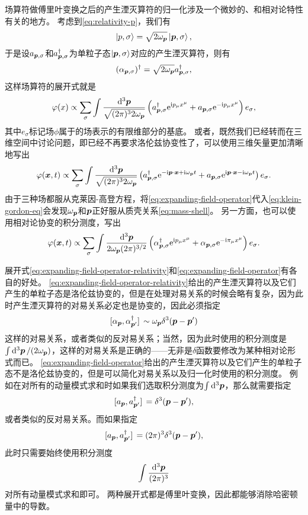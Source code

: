 \documentclass[hyperref, UTF8, a4paper]{ctexart}
\newcommand*{\ii}{\mathrm{i}}
\newcommand*{\ee}{\mathrm{e}}
\begin{document}
场算符做傅里叶变换之后的产生湮灭算符的归一化涉及一个微妙的、和相对论特性有关的地方。
考虑到\eqref{eq:relativity-p}，我们有
\[
    \ket{p, \sigma} = \sqrt{2 \omega_{\vb*{p}}} \ket{\vb*{p}, \sigma},
\]
于是设${a}_{\vb*{p}, \sigma}$和${a}^\dagger_{\vb*{p}, \sigma}$为单粒子态$\ket{\vb*{p}, \sigma}$对应的产生湮灭算符，则有
\[
    ({\alpha}_{\vb*{p}, \sigma})^\dagger = \sqrt{2\omega_{\vb*{p}}} {a}_{\vb*{p}, \sigma}^\dagger,
\]
这样场算符的展开式就是
\[
    {\varphi}(x) \propto \sum_\sigma \int \frac{\dd[3]{\vb*{p}}}{\sqrt{(2\pi)^3 2 \omega_{\vb*{p}}}} \left( {a}^\dagger_{\vb*{p}, \sigma} \ee^{\ii p_\mu x^\mu} + {a}_{\vb*{p}, \sigma} \ee^{- \ii p_\mu x^\mu} \right) e_\sigma,
\]
其中$e_\sigma$标记场$\phi$属于的场表示的有限维部分的基底。
或者，既然我们已经转而在三维空间中讨论问题，即已经不再要求洛伦兹协变性了，可以使用三维矢量更加清晰地写出
\begin{equation}
    {\varphi}(\vb*{x}, t) \propto \sum_\sigma \int \frac{\dd[3]{\vb*{p}}}{\sqrt{(2\pi)^3 2 \omega_{\vb*{p}}}} \left( {a}^\dagger_{\vb*{p}, \sigma} \ee^{- \ii \vb*{p} \cdot \vb*{x} + \ii \omega_{\vb*{p}} t} + {a}_{\vb*{p}, \sigma} \ee^{\ii \vb*{p} \cdot \vb*{x} - \ii \omega_{\vb*{p}} t} \right) e_\sigma. 
    \label{eq:expanding-field-operator}
\end{equation}
由于三种场都服从克莱因-高登方程，将\eqref{eq:expanding-field-operator}代入\eqref{eq:klein-gordon-eq}会发现$\omega_{\vb*{p}}$和$\vb*{p}$正好服从质壳关系\eqref{eq:mass-shell}。
另一方面，也可以使用相对论协变的积分测度，写出
\begin{equation}
    {\varphi}(\vb*{x}, t) \propto \sum_\sigma \int \frac{\dd[3]{\vb*{p}}}{2 \omega_{\vb*{p}} (2\pi)^{3/2}} \left( {\alpha}^\dagger_{\vb*{p}, \sigma} \ee^{ \ii p_\mu x^\mu} + {\alpha}_{\vb*{p}, \sigma} \ee^{- \ii \pi_\mu x^\mu} \right) e_\sigma. 
    \label{eq:expanding-field-operator-relativity}
\end{equation}

展开式\eqref{eq:expanding-field-operator-relativity}和\eqref{eq:expanding-field-operator}有各自的好处。
\eqref{eq:expanding-field-operator-relativity}给出的产生湮灭算符以及它们产生的单粒子态是洛伦兹协变的，但是在处理对易关系的时候会略有复杂，因为此时产生湮灭算符的对易关系必定也是协变的，因此必须指定
\[
    \comm*{{\alpha}_{\vb*{p}}}{{\alpha}^\dagger_{\vb*{p}'}} \sim \omega_{\vb*{p}} \delta^3 (\vb*{p} - \vb*{p}')
\]
这样的对易关系，或者类似的反对易关系；当然，因为此时使用的积分测度是$\int \dd[3]{\vb*{p}} / (2 \omega_{\vb*{p}})$，这样的对易关系是正确的——无非是$\delta$函数要修改为某种相对论形式而已。
\eqref{eq:expanding-field-operator}给出的产生湮灭算符以及它们产生的单粒子态不是洛伦兹协变的，但是可以简化对易关系以及归一化时使用的积分测度。
例如在对所有的动量模式求和时如果我们选取积分测度为$\int \dd[3]{\vb*{p}}$，那么就需要指定
\[
    \comm*{{a}_{\vb*{p}}}{{a}^\dagger_{\vb*{p}'}} = \delta^3 (\vb*{p} - \vb*{p}'),
\]
或者类似的反对易关系。而如果指定
\[
    \comm*{{a}_{\vb*{p}}}{{a}^\dagger_{\vb*{p}'}} = (2\pi)^3 \delta^3 (\vb*{p} - \vb*{p}'),
\]
此时只需要始终使用积分测度
\[
    \int \frac{\dd[3]{\vb*{p}}}{(2\pi)^3}
\]
对所有动量模式求和即可。
两种展开式都是傅里叶变换，因此都能够消除哈密顿量中的导数。
\end{document}
